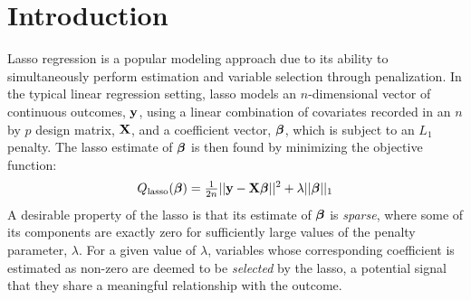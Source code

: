 \section{Introduction}
Lasso regression \citep{tibshirani_1996} is a popular modeling approach due to its ability to simultaneously perform estimation and variable selection through penalization. In the typical linear regression setting, lasso models an $n$-dimensional vector of continuous outcomes, $\mathbf{y}$, using a linear combination of covariates recorded in an $n$ by $p$ design matrix, $\mathbf{X}$, and a coefficient vector, $\boldsymbol{\beta}$, which is subject to an $L_1$ penalty. The lasso estimate of $\boldsymbol{\beta}$ is then found by minimizing the objective function:
\begin{equation*}
Q_{\text{lasso}}(\boldsymbol{\beta}) = \tfrac{1}{2n}||\mathbf{y} - \mathbf{X}\boldsymbol{\beta}||^2 + \lambda||\boldsymbol{\beta}||_1
\end{equation*}
A desirable property of the lasso is that its estimate of $\boldsymbol{\beta}$ is \textit{sparse}, where some of its components are exactly zero for sufficiently large values of the penalty parameter, $\lambda$. For a given value of $\lambda$, variables whose corresponding coefficient is estimated as non-zero are deemed to be \textit{selected} by the lasso, a potential signal that they share a meaningful relationship with the outcome. 

